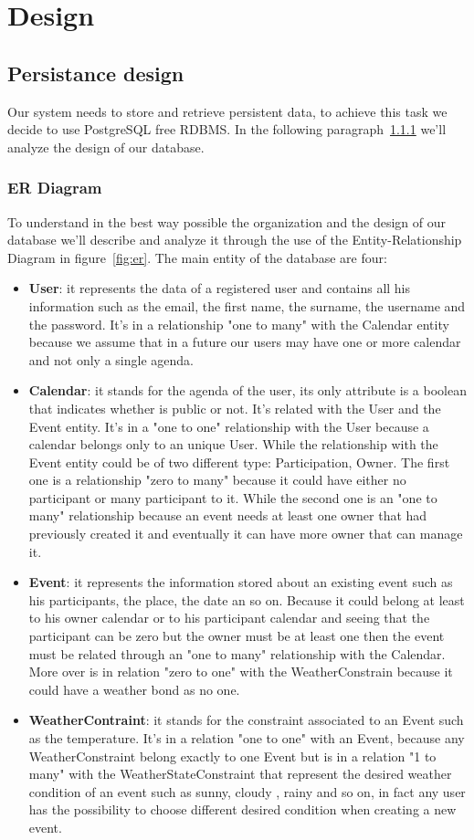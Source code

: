 \chapter{Design} \label{cap:cap3}

\section{Persistance design}
Our system needs to store and retrieve persistent data, to achieve this task we decide to use PostgreSQL free RDBMS. In the following paragraph~\ref{sec:er} we'll analyze the design of our database.
\subsection{ER Diagram}\label{sec:er}
To understand in the best way possible the organization and the design of our database we'll describe and analyze it through the use of the Entity-Relationship Diagram in figure~\ref{fig:er}.
The main entity of the database are four:
\begin{itemize}
\item{\bf User}: it represents the data of a registered user and contains all his information such as the email, the first name, the surname, the username and the password. It's in a relationship "one to many" with the Calendar entity because we assume that in a future our users may have one or more calendar and not only a single agenda.
\item{\bf Calendar}: it stands for the agenda of the user, its only attribute is a boolean that indicates whether is public or not. It's related with the User and the Event entity. It's in a "one to one" relationship with the User because a calendar belongs only to an unique User. While the relationship with the Event entity could be of two different type: Participation, Owner. The first one is a relationship "zero to many" because it could have either no participant or many participant to it. While the second one is an "one to many" relationship because an event needs at least one owner that had previously created it and eventually it can have more owner that can manage it.
\item{\bf Event}: it represents the information stored about an existing event such as his participants, the place, the date an so on. Because it could belong at least to his owner calendar or to his participant calendar and seeing that the participant can be zero but the owner must be at least one then the event must be related through an "one to many" relationship with the Calendar. More over is in relation "zero to one" with the WeatherConstrain because it could have a weather bond as no one.
\item{\bf WeatherContraint}: it stands for the constraint associated to an Event such as the temperature. It's in a relation "one to one" with an Event, because any WeatherConstraint belong exactly to one Event but is in a relation "1 to many" with the WeatherStateConstraint that represent the desired weather condition of an event such as sunny, cloudy , rainy and so on, in fact any user has the possibility to choose different desired condition when creating a new event.
\end{itemize}
